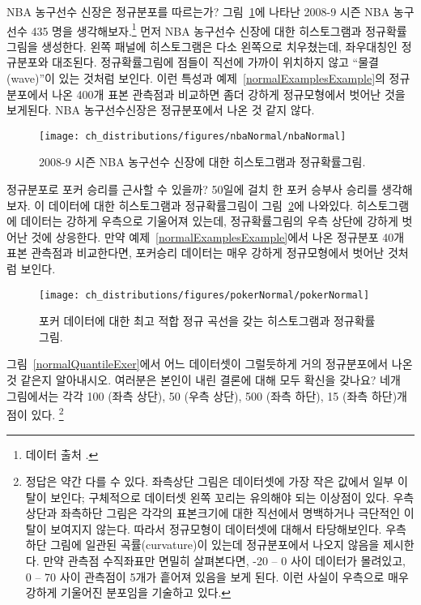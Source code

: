 \textC{\pagebreak}

\begin{example}{NBA 농구선수 신장은 정규분포를 따르는가? 그림~\ref{nbaNormal}에 나타난 2008-9 시즌 NBA 농구선수 435 명을 생각해보자.\footnote{데이터 출처 .}}
먼저 NBA 농구선수 신장에 대한 히스토그램과 정규확률그림을 생성한다. 왼쪽 패널에 히스토그램은 다소 왼쪽으로 치우쳤는데, 좌우대칭인 정규분포와 대조된다. 정규확률그림에 점들이 직선에 가까이 위치하지 않고 ``물결(wave)''이 있는 것처럼 보인다. 이런 특성과 예제~\ref{normalExamplesExample}의 정규분포에서 나온 400개 표본 관측점과 비교하면 좀더 강하게 정규모형에서 벗어난 것을 보게된다. NBA 농구선수신장은 정규분포에서 나온 것 같지 않다.
\end{example}

\begin{figure}
\centering
\texttt{[image: ch\_distributions/figures/nbaNormal/nbaNormal]}
\caption{2008-9 시즌 NBA 농구선수 신장에 대한 히스토그램과 정규확률그림.}
\label{nbaNormal}
\end{figure}

\begin{example}{
정규분포로 포커 승리를 근사할 수 있을까? 50일에 걸치 한 포커 승부사 승리를 생각해보자. 이 데이터에 대한 히스토그램과 정규확률그림이 그림~\ref{pokerNormal}에 나와있다.}
히스토그램에 데이터는 강하게 우측으로 기울어져 있는데, 정규확률그림의 우측 상단에 강하게 벗어난 것에 상응한다. 만약 예제~\ref{normalExamplesExample}에서 나온 정규분포 40개 표본 관측점과 비교한다면, 포커승리 데이터는 매우 강하게 정규모형에서 벗어난 것처럼 보인다.
\end{example}

\begin{figure}
\centering
\texttt{[image: ch\_distributions/figures/pokerNormal/pokerNormal]}
\caption{포커 데이터에 대한 최고 적합 정규 곡선을 갖는 히스토그램과 정규확률그림.}
\label{pokerNormal}
\end{figure}

\begin{exercise}\label{normalQuantileExercise}
그림~\ref{normalQuantileExer}에서 어느 데이터셋이 그럴듯하게 거의 정규분포에서 나온 것 같은지 알아내시오. 여러분은 본인이 내린 결론에 대해 모두 확신을 갖나요? 네개 그림에서는 각각 100 (좌측 상단), 50 (우측 상단), 500 (좌측 하단), 15 (좌측 하단)개 점이 있다.
\footnote{정답은 약간 다를 수 있다. 
좌측상단 그림은 데이터셋에 가장 작은 값에서 일부 이탈이 보인다; 구체적으로 데이터셋 왼쪽 꼬리는 유의해야 되는 이상점이 있다. 우측상단과 좌측하단 그림은 각각의 표본크기에 대한 직선에서 명백하거나 극단적인 이탈이 보여지지 않는다. 따라서 정규모형이 데이터셋에 대해서 타당해보인다. 우측하단 그림에 일관된 곡률(curvature)이 있는데 정규분포에서 나오지 않음을 제시한다. 만약 관측점 수직좌표만 면밀히 살펴본다면, -20 -- 0 사이 데이터가 몰려있고, 0 -- 70 사이 관측점이 5개가 흩어져 있음을 보게 된다. 이런 사실이 우측으로 매우 강하게 기울어진 분포임을 기술하고 있다.}
\end{exercise}

